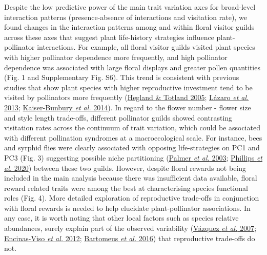 \documentclass[
  12pt,
  a4paper,
]{article}
\begin{document}
Despite the low predictive power of the main trait variation axes for broad-level interaction patterns (presence-absence of interactions and visitation rate), we found changes in the interaction patterns among and within floral visitor guilds across these axes that suggest plant life-history strategies influence plant-pollinator interactions. For example, all floral visitor guilds visited plant species with higher pollinator dependence more frequently, and high pollinator dependence was associated with large floral displays and greater pollen quantities (Fig. 1 and Supplementary Fig. S6). This trend is consistent with previous studies that show plant species with higher reproductive investment tend to be visited by pollinators more frequently (\protect\hyperlink{ref-hegland2005}{Hegland \& Totland 2005}; \protect\hyperlink{ref-lazaro2013}{Lázaro \emph{et al.} 2013}; \protect\hyperlink{ref-kaiser2014}{Kaiser-Bunbury \emph{et al.} 2014}). In regard to the flower number - flower size and style length trade-offs, different pollinator guilds showed contrasting visitation rates across the continuum of trait variation, which could be associated with different pollination syndromes at a macroecological scale. For instance, bees and syrphid flies were clearly associated with opposing life-strategies on PC1 and PC3 (Fig. 3) suggesting possible niche partitioning (\protect\hyperlink{ref-palmer2003}{Palmer \emph{et al.} 2003}; \protect\hyperlink{ref-phillips2020}{Phillips \emph{et al.} 2020}) between these two guilds. However, despite floral rewards not being included in the main analysis because there was insufficient data available, floral reward related traits were among the best at characterising species functional roles (Fig. 4). More detailed exploration of reproductive trade-offs in conjunction with floral rewards is needed to help elucidate plant-pollinator associations. In any case, it is worth noting that other local factors such as species relative abundances, surely explain part of the observed variability (\protect\hyperlink{ref-vazquez2007}{Vázquez \emph{et al.} 2007}; \protect\hyperlink{ref-encinas2012}{Encinas-Viso \emph{et al.} 2012}; \protect\hyperlink{ref-bartomeus2016}{Bartomeus \emph{et al.} 2016}) that reproductive trade-offs do not.
\end{document}
